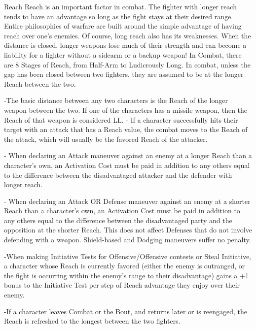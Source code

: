\documentclass[oneside,11pt,english]{book}
\begin{document}
 

Reach 
Reach is an important factor in combat. The fighter with longer reach tends to have an advantage so long 
as the fight stays at their desired range. Entire philosophies of warfare are built around the simple 
advantage of having reach over one’s enemies. Of course, long reach also has its weaknesses. When the 
distance is closed, longer weapons lose much of their strength and can become a liability for a fighter 
without a sidearm or a backup weapon! 
In Combat, there are 8 Stages of Reach, from Half-Arm to Ludicrously Long. In combat, unless the gap 
has been closed between two fighters, they are assumed to be at the longer Reach between the two. 

 

-The basic distance between any two characters is the Reach of the longer weapon between the 
two. If one of the characters has a missile weapon, then the Reach of that weapon is considered 
LL. 
- If a character successfully hits their target with an attack that has a Reach value, the combat 
moves to the Reach of the attack, which will usually be the favored Reach of the attacker. 

 

- When declaring an Attack maneuver against an enemy at a longer Reach than a character’s own, 
an Activation Cost must be paid in addition to any others equal to the difference between the 
disadvantaged attacker and the defender with longer reach. 

 

- When declaring an Attack OR Defense maneuver against an enemy at a shorter Reach than a 
character’s own, an Activation Cost must be paid in addition to any others equal to the difference 
between the disadvantaged party and the opposition at the shorter Reach. 
This does not affect Defenses that do not involve defending with a weapon. Shield-based and 
Dodging maneuvers suffer no penalty. 

 

-When making Initiative Tests for Offensive/Offensive contests or Steal Initiative, a character 
whose Reach is currently favored (either the enemy is outranged, or the fight is occurring within 
the enemy’s range to their disadvantage) gains a +1 bonus to the Initiative Test per step of Reach 
advantage they enjoy over their enemy. 

 

-If a character leaves Combat or the Bout, and returns later or is reengaged, the Reach is refreshed 
to the longest between the two fighters. 
\end{document}
